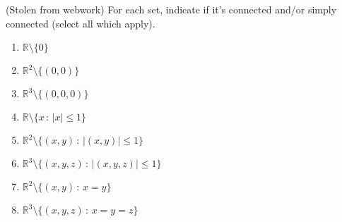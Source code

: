 \documentclass{ximera}
\begin{document}
\begin{problem}(Stolen from webwork) For each set, indicate if it's connected and/or simply connected (select all which apply).
\begin{enumerate}
\item $\mathbb{R}\setminus \{0\}$
\begin{selectAll}
\end{selectAll}
\item $\mathbb{R}^2\setminus \{(0,0)\}$
\begin{selectAll}
\end{selectAll}
\item $\mathbb{R}^3\setminus \{(0,0,0)\}$
\begin{selectAll}
\end{selectAll}
\item $\mathbb{R}\setminus \{x\,:\,|x|\leq 1\}$
\begin{selectAll}
\end{selectAll}
\item $\mathbb{R}^2\setminus \{(x,y)\,:\,|(x,y)|\leq 1\}$
\begin{selectAll}
\end{selectAll}
\item $\mathbb{R}^3\setminus \{(x,y,z)\,:\,|(x,y,z)|\leq 1\}$
\begin{selectAll}
\end{selectAll}
\item $\mathbb{R}^2\setminus \{(x,y)\,:\,x=y\}$
\begin{selectAll}
\end{selectAll}
\item $\mathbb{R}^3\setminus \{(x,y,z)\,:\,x=y=z\}$ 
\begin{selectAll}
\end{selectAll}
\end{enumerate}
\end{problem}
\end{document}
